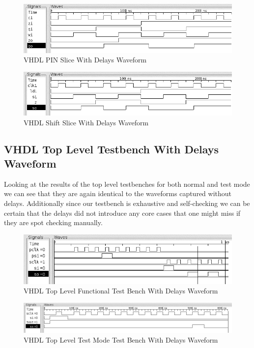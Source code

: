         \begin{figure}[H]
            \centering
            \includegraphics[width=0.8\linewidth]{../../doc/vhdl_sim_pics/pin_slice_with_delays.png}
            \caption{VHDL PIN Slice With Delays Waveform}
        \end{figure}

        \begin{figure}[H]
            \centering
            \includegraphics[width=0.8\linewidth]{../../doc/vhdl_sim_pics/shift_slice_with_delays.png}
            \caption{VHDL Shift Slice With Delays Waveform}
        \end{figure}

    \subsection{VHDL Top Level Testbench With Delays Waveform}

        Looking at the results of the top level testbenches for both normal and
        test mode we can see that they are again identical to the waveforms
        captured without delays.  Additionally since our testbench is
        exhaustive and self-checking we can be certain that the delays did not
        introduce any core cases that one might miss if they are spot checking
        manually.
        \begin{figure}[H]
            \centering
            \includegraphics[width=0.8\linewidth]{../../doc/vhdl_sim_pics/top.png}
            \caption{VHDL Top Level Functional Test Bench With Delays Waveform}
        \end{figure}

        \begin{figure}[H]
            \centering
            \includegraphics[width=0.8\linewidth]{../../doc/vhdl_sim_pics/top_test.png}
            \caption{VHDL Top Level Test Mode Test Bench With Delays Waveform}
        \end{figure}

